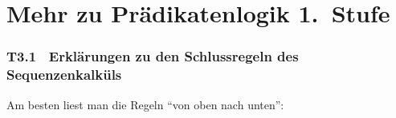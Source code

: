 \documentclass[fontsize=11pt, twoside=false, numbers=autoenddot]{scrbook}
\begin{document}
\part{Mehr zu Prädikatenlogik 1.\ Stufe}

\section*{T3.1~ Erklärungen zu den Schlussregeln des Sequenzenkalküls}

Am besten liest man die Regeln "`von oben nach unten"':
%
\par\medskip
\end{document}
